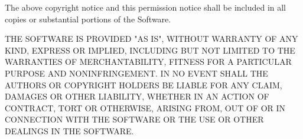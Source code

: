 \documentclass[11pt,parskip=half,a4paper]{scrartcl}
\begin{document}
The above copyright notice and this permission notice shall be included in all copies or substantial portions of the Software.

THE SOFTWARE IS PROVIDED "AS IS", WITHOUT WARRANTY OF ANY KIND, EXPRESS OR IMPLIED, INCLUDING BUT NOT LIMITED TO THE WARRANTIES OF MERCHANTABILITY, FITNESS FOR A PARTICULAR PURPOSE AND NONINFRINGEMENT. IN NO EVENT SHALL THE AUTHORS OR COPYRIGHT HOLDERS BE LIABLE FOR ANY CLAIM, DAMAGES OR OTHER LIABILITY, WHETHER IN AN ACTION OF CONTRACT, TORT OR OTHERWISE, ARISING FROM, OUT OF OR IN CONNECTION WITH THE SOFTWARE OR THE USE OR OTHER DEALINGS IN THE SOFTWARE.
\end{document}
